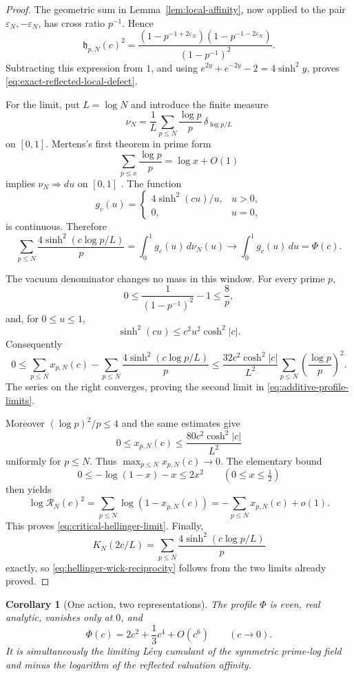 \documentclass[11pt]{article}
\newtheorem{corollary}[theorem]{Corollary}
\theoremstyle{definition}
\theoremstyle{remark}
\begin{document}
\begin{proof}
The geometric sum in Lemma~\ref{lem:local-affinity}, now applied to the pair
\(\varepsilon_N,-\varepsilon_N\), has cross ratio \(p^{-1}\).  Hence
\[
 \mathfrak h_{p,N}(c)^2
 =
 \frac{(1-p^{-1+2\varepsilon_N})(1-p^{-1-2\varepsilon_N})}
      {(1-p^{-1})^2}.
\]
Subtracting this expression from \(1\), and using
\(e^{2y}+e^{-2y}-2=4\sinh^2y\), proves
\eqref{eq:exact-reflected-local-defect}.

For the limit, put \(L=\log N\) and introduce the finite measure
\[
 \nu_N=\frac1L\sum_{p\leq N}\frac{\log p}{p}\,
 \delta_{\log p/L}
\]
on \([0,1]\).  Mertens's first theorem in prime form
\[
 \sum_{p\leq x}\frac{\log p}{p}=\log x+O(1)
\]
implies \(\nu_N\Rightarrow du\) on \([0,1]\)
\cite{Mertens1874}.  The function
\[
 g_c(u)=
 \begin{cases}
 4\sinh^2(cu)/u,&u>0,\\
 0,&u=0,
 \end{cases}
\]
is continuous.  Therefore
\[
 \sum_{p\leq N}\frac{4\sinh^2(c\log p/L)}p
 =\int_0^1g_c(u)\,d\nu_N(u)
 \longrightarrow\int_0^1g_c(u)\,du=\Phi(c).
\]

The vacuum denominator changes no mass in this window.  For every prime \(p\),
\[
 0\leq\frac1{(1-p^{-1})^2}-1\leq\frac8p,
\]
and, for \(0\leq u\leq1\),
\[
 \sinh^2(cu)\leq c^2u^2\cosh^2|c|.
\]
Consequently
\[
 0\leq
 \sum_{p\leq N}x_{p,N}(c)-
 \sum_{p\leq N}\frac{4\sinh^2(c\log p/L)}p
 \leq
 \frac{32c^2\cosh^2|c|}{L^2}
 \sum_{p\leq N}\left(\frac{\log p}{p}\right)^2.
\]
The series on the right converges, proving the second limit in
\eqref{eq:additive-profile-limits}.

Moreover \((\log p)^2/p\leq4\) and the same estimates give
\[
 0\leq x_{p,N}(c)\leq
 \frac{80c^2\cosh^2|c|}{L^2}
\]
uniformly for \(p\leq N\).  Thus \(\max_{p\leq N}x_{p,N}(c)\to0\).  The elementary
bound
\[
 0\leq-\log(1-x)-x\leq2x^2
 \qquad(0\leq x\leq\tfrac12)
\]
then yields
\[
 \log\mathcal R_N(c)^2
 =\sum_{p\leq N}\log(1-x_{p,N}(c))
 =-\sum_{p\leq N}x_{p,N}(c)+o(1).
\]
This proves \eqref{eq:critical-hellinger-limit}.  Finally,
\[
 K_N(2c/L)
 =\sum_{p\leq N}\frac{4\sinh^2(c\log p/L)}p
\]
exactly, so \eqref{eq:hellinger-wick-reciprocity} follows from the two limits already proved.
\end{proof}

\begin{corollary}[One action, two representations]\label{cor:one-action}
The profile \(\Phi\) is even, real analytic, vanishes only at \(0\), and
\[
 \Phi(c)=2c^2+\frac13c^4+O(c^6)\qquad(c\to0).
\]
It is simultaneously the limiting L\'evy cumulant of the symmetric prime-log field and minus
the logarithm of the reflected valuation affinity.
\end{corollary}
\end{document}
